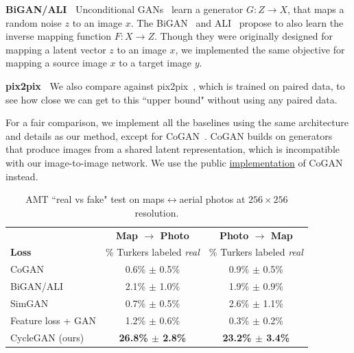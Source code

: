 {\bf BiGAN/ALI~\cite{dumoulin2016adversarially,donahue2016adversarial}} Unconditional GANs~\cite{goodfellow2014generative} learn a generator $G: Z\rightarrow X$, that maps a random noise $z$ to an image $x$. The BiGAN~\cite{dumoulin2016adversarially} and ALI~\cite{donahue2016adversarial} propose to also learn the inverse mapping function $F: X\rightarrow Z$. Though they were originally designed for mapping a latent vector $z$ to an image $x$, we implemented the same objective for mapping a source image $x$ to a target image $y$.

{\bf pix2pix~\cite{isola2016image}} We also compare against pix2pix~\cite{isola2016image}, which is trained on paired data, to see how close we can get to this ``upper bound" without using any paired data. 

For a fair comparison, we implement all the baselines using the same architecture and details as our method, except for CoGAN~\cite{liu2016coupled}. CoGAN builds on generators that produce images from a shared latent representation, which is incompatible with our image-to-image network. We use the public \href{https://github.com/mingyuliutw/CoGAN}{implementation} of CoGAN instead.



\begin{table}
\centering
\scalebox{0.75} {
\begin{tabular}{lcc}
 & \textbf{Map $\rightarrow$ Photo}  &  \textbf{Photo $\rightarrow$ Map} \\ 
\textbf{Loss} & \% Turkers labeled \emph{real} & \% Turkers labeled \emph{real} \\
\hline
CoGAN~\cite{liu2016coupled} & 0.6\% $\pm$ 0.5\% & 0.9\% $\pm$ 0.5\% \\
BiGAN/ALI~\cite{dumoulin2016adversarially,donahue2016adversarial} & 2.1\% $\pm$ 1.0\% & 1.9\% $\pm$ 0.9\% \\
SimGAN~\cite{shrivastava2016learning} & 0.7\% $\pm$ 0.5\% & 2.6\% $\pm$ 1.1\% \\
Feature loss + GAN & 1.2\% $\pm$ 0.6\% & 0.3\% $\pm$ 0.2\% \\
CycleGAN (ours)  & {\bf 26.8\% $\pm$ 2.8\%} &  {\bf 23.2\% $\pm$ 3.4\%} \\
\end{tabular} }
\vspace{-0.1in}
\caption {AMT ``real vs fake" test on maps$\leftrightarrow$aerial photos at $256\times 256$ resolution.}
\vspace{-0.1in}
\end{table}


